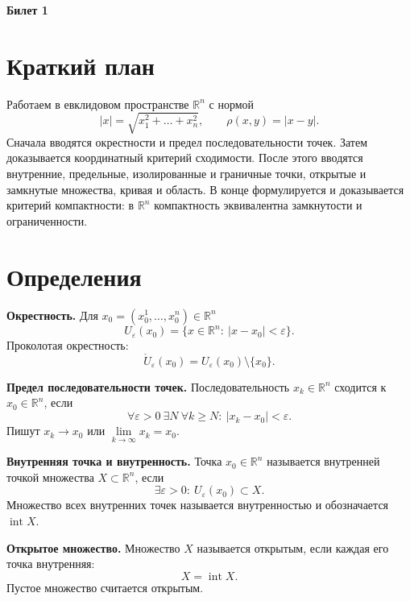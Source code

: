 \documentclass[12pt,a4paper]{article}
\newcommand{\R}{\mathbb{R}}
\newcommand{\eps}{\varepsilon}
\newcommand{\Ball}[2]{U_{#1}(#2)}
\newcommand{\PBall}[2]{\mathring U_{#1}(#2)}
\begin{document}
\begin{center}
{\Large\bfseries Билет 1}
\end{center}

\noindent{}

\section*{Краткий план}

Работаем в евклидовом пространстве \(\R^n\) с нормой
\[
  |x|=\sqrt{x_1^2+\dots+x_n^2}, \qquad \rho(x,y)=|x-y|.
\]
Сначала вводятся окрестности и предел последовательности точек. Затем
доказывается координатный критерий сходимости. После этого вводятся
внутренние, предельные, изолированные и граничные точки, открытые и
замкнутые множества, кривая и область. В конце формулируется и доказывается
критерий компактности: в \(\R^n\) компактность эквивалентна замкнутости и
ограниченности.

\section*{Определения}

\textbf{Окрестность.}
Для \(x_0=(x_0^1,\dots,x_0^n)\in\R^n\)
\[
  \Ball{\eps}{x_0}=\{x\in\R^n:\ |x-x_0|<\eps\}.
\]
Проколотая окрестность:
\[
  \PBall{\eps}{x_0}=\Ball{\eps}{x_0}\setminus\{x_0\}.
\]

\textbf{Предел последовательности точек.}
Последовательность \(x_k\in\R^n\) сходится к \(x_0\in\R^n\), если
\[
  \forall \eps>0\ \exists N\ \forall k\ge N:\ |x_k-x_0|<\eps.
\]
Пишут \(x_k\to x_0\) или \(\lim\limits_{k\to\infty}x_k=x_0\).

\textbf{Внутренняя точка и внутренность.}
Точка \(x_0\in\R^n\) называется внутренней точкой множества \(X\subset\R^n\),
если
\[
  \exists \eps>0:\ \Ball{\eps}{x_0}\subset X.
\]
Множество всех внутренних точек называется внутренностью и обозначается
\(\operatorname{int}X\).

\textbf{Открытое множество.}
Множество \(X\) называется открытым, если каждая его точка внутренняя:
\[
  X=\operatorname{int}X.
\]
Пустое множество считается открытым.
\end{document}
